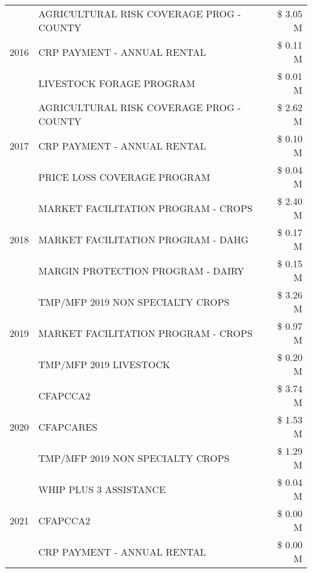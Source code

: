 \begin{tabular}{llr}
\cline{1-3}
\multirow[t]{3}{*}{2016} & AGRICULTURAL RISK COVERAGE PROG - COUNTY      & \$ 3.05 M \\
 & CRP PAYMENT - ANNUAL RENTAL                   & \$ 0.11 M \\
 & LIVESTOCK FORAGE PROGRAM                      & \$ 0.01 M \\
\cline{1-3}
\multirow[t]{3}{*}{2017} & AGRICULTURAL RISK COVERAGE PROG - COUNTY & \$ 2.62 M \\
 & CRP PAYMENT - ANNUAL RENTAL & \$ 0.10 M \\
 & PRICE LOSS COVERAGE PROGRAM & \$ 0.04 M \\
\cline{1-3}
\multirow[t]{3}{*}{2018} & MARKET FACILITATION PROGRAM - CROPS & \$ 2.40 M \\
 & MARKET FACILITATION PROGRAM - DAHG & \$ 0.17 M \\
 & MARGIN PROTECTION PROGRAM - DAIRY & \$ 0.15 M \\
\cline{1-3}
\multirow[t]{3}{*}{2019} & TMP/MFP 2019 NON SPECIALTY CROPS & \$ 3.26 M \\
 & MARKET FACILITATION PROGRAM - CROPS & \$ 0.97 M \\
 & TMP/MFP 2019 LIVESTOCK & \$ 0.20 M \\
\cline{1-3}
\multirow[t]{3}{*}{2020} & CFAPCCA2 & \$ 3.74 M \\
 & CFAPCARES & \$ 1.53 M \\
 & TMP/MFP 2019 NON SPECIALTY CROPS & \$ 1.29 M \\
\cline{1-3}
\multirow[t]{3}{*}{2021} & WHIP PLUS 3 ASSISTANCE & \$ 0.04 M \\
 & CFAPCCA2 & \$ 0.00 M \\
 & CRP PAYMENT - ANNUAL RENTAL & \$ 0.00 M \\
\cline{1-3}
\bottomrule
\end{tabular}
